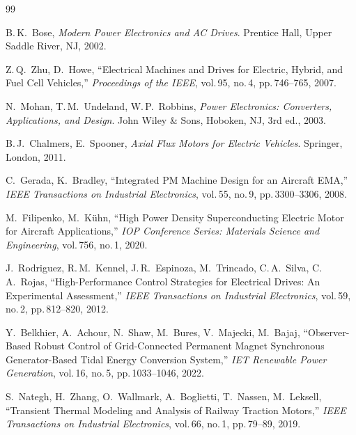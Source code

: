 ﻿\documentclass[a4paper,12pt]{article}
\theoremstyle{definition}
\begin{document}
\newpage

\begin{thebibliography}{99}

B.\,K.\ Bose,
\textit{Modern Power Electronics and AC Drives}.
Prentice Hall, Upper Saddle River, NJ, 2002.

Z.\,Q.\ Zhu, D.\ Howe,
``Electrical Machines and Drives for Electric, Hybrid, and Fuel Cell Vehicles,''
\textit{Proceedings of the IEEE}, vol.\,95, no.\,4, pp.\,746--765, 2007.

N.\ Mohan, T.\,M.\ Undeland, W.\,P.\ Robbins,
\textit{Power Electronics: Converters, Applications, and Design}.
John Wiley \& Sons, Hoboken, NJ, 3rd ed., 2003.

B.\,J.\ Chalmers, E.\ Spooner,
\textit{Axial Flux Motors for Electric Vehicles}.
Springer, London, 2011.

C.\ Gerada, K.\ Bradley,
``Integrated PM Machine Design for an Aircraft EMA,''
\textit{IEEE Transactions on Industrial Electronics}, vol.\,55, no.\,9,
pp.\,3300--3306, 2008.

M.\ Filipenko, M.\ Kühn,
``High Power Density Superconducting Electric Motor for Aircraft Applications,''
\textit{IOP Conference Series: Materials Science and Engineering},
vol.\,756, no.\,1, 2020.

J.\ Rodriguez, R.\,M.\ Kennel, J.\,R.\ Espinoza, M.\ Trincado, C.\,A.\ Silva,
C.\,A.\ Rojas,
``High-Performance Control Strategies for Electrical Drives: An Experimental
Assessment,''
\textit{IEEE Transactions on Industrial Electronics}, vol.\,59, no.\,2,
pp.\,812--820, 2012.

Y.\ Belkhier, A.\ Achour, N.\ Shaw, M.\ Bures, V.\ Majecki, M.\ Bajaj,
``Observer-Based Robust Control of Grid-Connected Permanent Magnet Synchronous
Generator-Based Tidal Energy Conversion System,''
\textit{IET Renewable Power Generation}, vol.\,16, no.\,5, pp.\,1033--1046, 2022.

S.\ Nategh, H.\ Zhang, O.\ Wallmark, A.\ Boglietti, T.\ Nassen, M.\ Leksell,
``Transient Thermal Modeling and Analysis of Railway Traction Motors,''
\textit{IEEE Transactions on Industrial Electronics}, vol.\,66, no.\,1,
pp.\,79--89, 2019.


\end{thebibliography}
\end{document}
